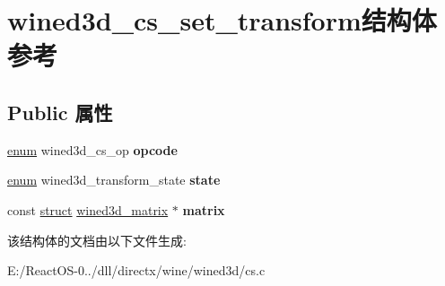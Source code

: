 \hypertarget{structwined3d__cs__set__transform}{}\section{wined3d\+\_\+cs\+\_\+set\+\_\+transform结构体 参考}
\label{structwined3d__cs__set__transform}
\subsection*{Public 属性}
\begin{DoxyCompactItemize}
\item 
\mbox{\label{structwined3d__cs__set__transform_a1d9cb8941def5e2f9e98369c59c32c69}} 
\hyperlink{interfaceenum}{enum} wined3d\+\_\+cs\+\_\+op {\bfseries opcode}
\item 
\mbox{\label{structwined3d__cs__set__transform_a501aafdc25dd79c063c5d6c80a1d0c62}} 
\hyperlink{interfaceenum}{enum} wined3d\+\_\+transform\+\_\+state {\bfseries state}
\item 
\mbox{\label{structwined3d__cs__set__transform_a7fac479682fb870d424ce9b56d7fa08b}} 
const \hyperlink{interfacestruct}{struct} \hyperlink{structwined3d__matrix}{wined3d\+\_\+matrix} $\ast$ {\bfseries matrix}
\end{DoxyCompactItemize}


该结构体的文档由以下文件生成\+:\begin{DoxyCompactItemize}
\item 
E\+:/\+React\+O\+S-\/0../dll/directx/wine/wined3d/cs.\+c\end{DoxyCompactItemize}
